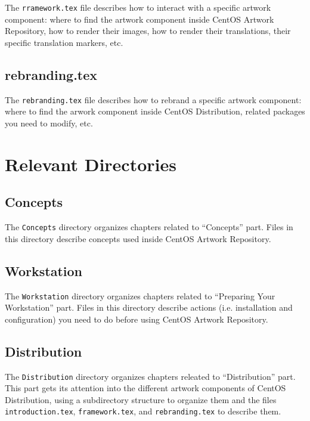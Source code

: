 The \texttt{rramework.tex} file describes how to interact with a
specific artwork component: where to find the artwork component inside
CentOS Artwork Repository, how to render their images, how to render
their translations, their specific translation markers, etc.

\subsection{rebranding.tex} 

The \texttt{rebranding.tex} file describes how to rebrand a specific
artwork component: where to find the arwork component inside CentOS
Distribution, related packages you need to modify, etc.

\section{Relevant Directories}
\hypertarget{sec:Concepts:Manuals:Directories}{}
\label{sec:Concepts:Manuals:Directories}

\subsection{Concepts}

The \texttt{Concepts} directory organizes chapters related to
``Concepts'' part.  Files in this directory describe concepts used
inside CentOS Artwork Repository.

\subsection{Workstation} 

The \texttt{Workstation} directory organizes chapters related to
``Preparing Your Workstation'' part. Files in this directory describe
actions (i.e. installation and configuration) you need to do before
using CentOS Artwork Repository. 

\subsection{Distribution} 

The \texttt{Distribution} directory organizes chapters releated to
``Distribution'' part. This part gets its attention into the different
artwork components of CentOS Distribution, using a subdirectory
structure to organize them and the files \texttt{introduction.tex},
\texttt{framework.tex}, and \texttt{rebranding.tex} to describe them.

